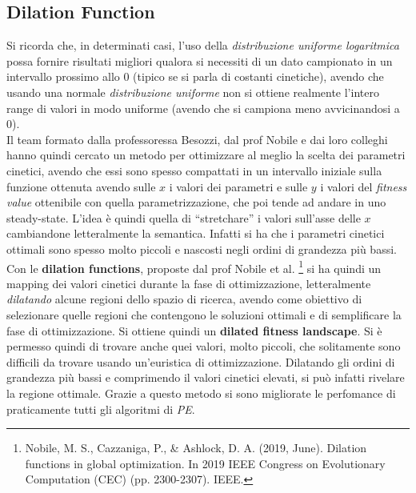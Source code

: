 \documentclass[a4paper,12pt, oneside]{book}
\begin{document}
\subsection{Dilation Function}
Si ricorda che, in determinati casi, l'uso della \textit{distribuzione uniforme
  logaritmica} possa fornire risultati migliori qualora si necessiti di un dato
campionato in un intervallo prossimo allo 0 (tipico se si parla di costanti
cinetiche), avendo che usando una normale 
\textit{distribuzione uniforme} non si ottiene realmente l'intero range di
valori in modo uniforme (avendo che si campiona meno avvicinandosi a 0). \\
Il team formato dalla professoressa Besozzi, dal prof Nobile e dai loro colleghi
hanno 
quindi cercato un metodo per ottimizzare al meglio la scelta dei parametri
cinetici, avendo che essi sono spesso compattati in un intervallo iniziale sulla
funzione ottenuta avendo sulle $x$ i valori dei parametri e sulle $y$ i valori
del \textit{fitness value} ottenibile con quella parametrizzazione, che poi
tende ad andare in uno steady-state. L'idea è quindi quella di 
``stretchare'' i valori sull'asse delle $x$ cambiandone letteralmente la
semantica. Infatti si ha che i parametri cinetici ottimali sono spesso molto
piccoli e nascosti negli ordini di grandezza più bassi. Con le \textbf{dilation
  functions}, proposte dal prof Nobile et al. \footnote{Nobile, M. S.,
  Cazzaniga, P., \& Ashlock, D. A. (2019,
  June). Dilation functions in global optimization. In 2019 IEEE Congress on
  Evolutionary Computation (CEC) (pp. 2300-2307). IEEE.} si ha quindi un mapping
dei valori cinetici durante la fase di 
ottimizzazione, letteralmente \textit{dilatando} alcune regioni dello spazio di
ricerca, avendo come obiettivo di selezionare quelle regioni che contengono le
soluzioni ottimali e di semplificare la fase di ottimizzazione. Si ottiene
quindi un \textbf{dilated fitness landscape}. Si è permesso
quindi di trovare anche quei valori, molto 
piccoli, che solitamente sono difficili da trovare usando un'euristica di
ottimizzazione. Dilatando gli ordini di grandezza più bassi e comprimendo il
valori cinetici elevati, si può infatti rivelare la regione ottimale. Grazie a
questo metodo si sono migliorate le perfomance di praticamente tutti gli
algoritmi di \textit{PE}.
\end{document}
